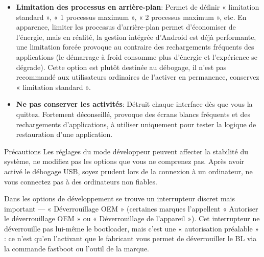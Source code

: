 \begin{itemize}
  \item \textbf{Limitation des processus en arrière-plan}: Permet de définir « limitation standard », « 1 processus maximum », « 2 processus maximum », etc. En apparence, limiter les processus d'arrière-plan permet d'économiser de l'énergie, mais en réalité, la gestion intégrée d'Android est déjà performante, une limitation forcée provoque au contraire des rechargements fréquents des applications (le démarrage à froid consomme plus d'énergie et l'expérience se dégrade). Cette option est plutôt destinée au débogage, il n'est pas recommandé aux utilisateurs ordinaires de l'activer en permanence, conservez « limitation standard ».
  \item \textbf{Ne pas conserver les activités}: Détruit chaque interface dès que vous la quittez. Fortement déconseillé, provoque des écrans blancs fréquents et des rechargements d'applications, à utiliser uniquement pour tester la logique de restauration d'une application.
\end{itemize}

\begin{tcbwarn}{Précautions}
Les réglages du mode développeur peuvent affecter la stabilité du système, ne modifiez pas les options que vous ne comprenez pas. Après avoir activé le débogage USB, soyez prudent lors de la connexion à un ordinateur, ne vous connectez pas à des ordinateurs non fiables.

\end{tcbwarn}


Dans les options de développement se trouve un interrupteur discret mais important — « Déverrouillage OEM » (certaines marques l'appellent « Autoriser le déverrouillage OEM » ou « Déverrouillage de l'appareil »). Cet interrupteur ne déverrouille pas lui-même le bootloader, mais c'est une « autorisation préalable » : ce n'est qu'en l'activant que le fabricant vous permet de déverrouiller le BL via la commande fastboot ou l'outil de la marque.

